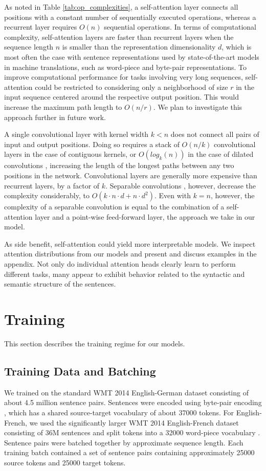 As noted in Table \ref{tab:op_complexities}, a self-attention layer connects all positions with a constant number of sequentially executed operations, whereas a recurrent layer requires $O(n)$ sequential operations.
In terms of computational complexity, self-attention layers are faster than recurrent layers when the sequence length $n$ is smaller than the representation dimensionality $d$, which is most often the case with sentence representations used by state-of-the-art models in machine translations, such as word-piece \citep{wu2016google} and byte-pair \citep{sennrich2015neural} representations.
To improve computational performance for tasks involving very long sequences, self-attention could be restricted to considering only a neighborhood of size $r$ in the input sequence centered around the respective output position. This would increase the maximum path length to $O(n/r)$. We plan to investigate this approach further in future work.

A single convolutional layer with kernel width $k < n$ does not connect all pairs of input and output positions. Doing so requires a stack of $O(n/k)$ convolutional layers in the case of contiguous kernels, or $O(log_k(n))$ in the case of dilated convolutions \citep{NalBytenet2017}, increasing the length of the longest paths between any two positions in the network.
Convolutional layers are generally more expensive than recurrent layers, by a factor of $k$. Separable convolutions \citep{xception2016}, however, decrease the complexity considerably, to $O(k \cdot n \cdot d + n \cdot d^2)$. Even with $k=n$, however, the complexity of a separable convolution is equal to the combination of a self-attention layer and a point-wise feed-forward layer, the approach we take in our model.

As side benefit, self-attention could yield more interpretable models. We inspect attention distributions from our models and present and discuss examples in the appendix. Not only do individual attention heads clearly learn to perform different tasks, many appear to exhibit behavior related to the syntactic and semantic structure of the sentences.


\section{Training}
This section describes the training regime for our models.

\subsection{Training Data and Batching}
We trained on the standard WMT 2014 English-German dataset consisting of about 4.5 million sentence pairs.  Sentences were encoded using byte-pair encoding \citep{DBLP:journals/corr/BritzGLL17}, which has a shared source-target vocabulary of about 37000 tokens. For English-French, we used the significantly larger WMT 2014 English-French dataset consisting of 36M sentences and split tokens into a 32000 word-piece vocabulary \citep{wu2016google}.  Sentence pairs were batched together by approximate sequence length.  Each training batch contained a set of sentence pairs containing approximately 25000 source tokens and 25000 target tokens.

